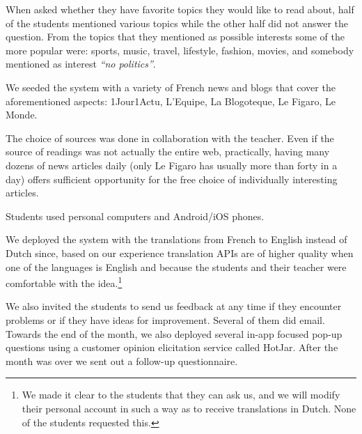 When asked whether they have favorite topics they would like to read about, half of the students mentioned various topics while the other half did not answer the question. From the topics that they mentioned as possible interests some of the more popular were: sports, music, travel, lifestyle, fashion, movies, and somebody mentioned as interest {\em ``no politics''}.


We seeded the system with a variety of French news and blogs that cover the aforementioned aspects: 1Jour1Actu, L'Equipe, La Blogoteque, Le Figaro, Le Monde. 

	
	The choice of sources was done in collaboration with the teacher. Even if the source of readings was not actually the entire web, practically, having many dozens of news articles daily (only Le Figaro has usually more than forty in a day) offers sufficient opportunity for the free choice of individually interesting articles. 
	



Students used personal computers and Android/iOS phones.

	We deployed the system with the translations from French to English instead of Dutch since, based on our experience translation APIs are of higher quality when one of the languages is English and because the students and their teacher were comfortable with the idea.\footnote{We made it clear to the students that they can ask us, and we will modify their personal account in such a way as to receive translations in Dutch. None of the students requested this.}

We also invited the students to send us feedback at any time if they encounter problems or if they have ideas for improvement. Several of them did email. Towards the end of the month, we also deployed several in-app focused pop-up questions using a customer opinion elicitation service called HotJar. After the month was over we sent out a follow-up questionnaire.



